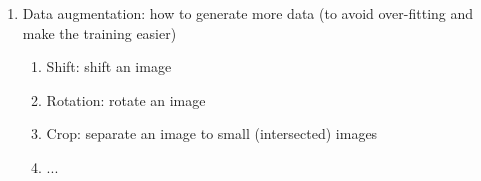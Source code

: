 \begin{enumerate}
		\item Data augmentation: how to generate more data (to avoid over-fitting and make the training easier)
			\begin{enumerate}
				\item Shift: shift an image
				\item Rotation: rotate an image
				\item Crop: separate an image to small (intersected) images
				\item ...
			\end{enumerate}
	\end{enumerate}
	

